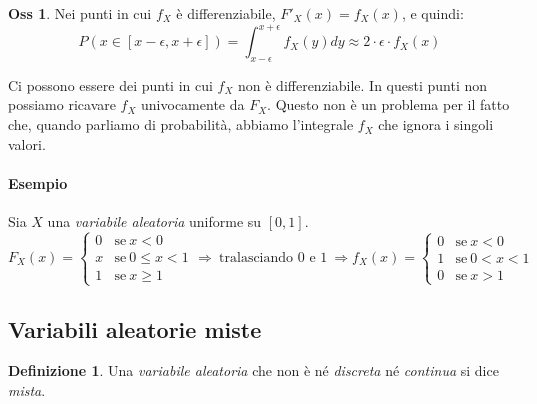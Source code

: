 \documentclass[12pt, a4paper]{report}
\theoremstyle{definition}
\newtheorem{definition}{Definizione}[section]
\newtheorem*{observation}{Oss}
\begin{document}
\newpage
\begin{observation}
	Nei punti in cui $f_X$ è differenziabile, \(F'_X(x)=f_X(x)\), e quindi:
	\[P(x\in[x-\epsilon, x+\epsilon])=\int_{x-\epsilon}^{x+\epsilon}f_X(y)dy
	\approx 2\cdot \epsilon\cdot f_X(x)\]

	Ci possono essere dei punti in cui $f_X$ non è differenziabile. In questi
	punti non possiamo ricavare $f_X$ univocamente da $F_X$. Questo non è un
	problema per il fatto che, quando parliamo di probabilità, abbiamo
	l'integrale $f_X$ che ignora i singoli valori.
\end{observation}

\paragraph*{Esempio}
Sia $X$ una \emph{variabile aleatoria} uniforme su $[0,1]$.
\[F_X(x)=\begin{cases}
	{0} & \text{se}\ {x < 0}\\
	{x} & \text{se}\ {0\leq x<1}\\
	{1} & \text{se}\ {x\geq 1}
\end{cases}\Rightarrow\ \text{tralasciando 0 e 1}\ \Rightarrow
f_X(x)=\begin{cases}
	{0} & \text{se}\ {x<0}\\
	{1} & \text{se}\ {0<x<1}\\
	{0} & \text{se}\ {x>1}
\end{cases}\]

\begin{center}
\end{center}

\subsection{Variabili aleatorie miste}
\begin{definition}
	Una \emph{variabile aleatoria} che non è né \emph{discreta} né \emph{continua}
	si dice \emph{mista}.
\end{definition}
\end{document}
